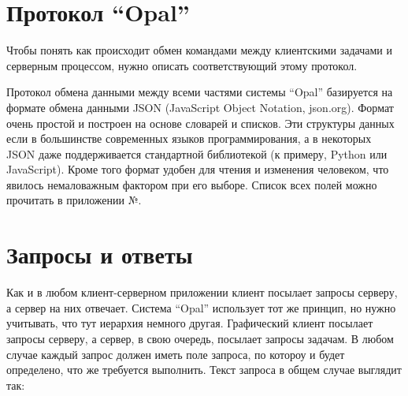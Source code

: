 \section{Протокол “Opal”}

Чтобы понять как происходит обмен командами между клиентскими задачами и серверным процессом, нужно описать соответствующий этому протокол.

Протокол обмена данными между всеми частями системы “Opal” базируется на формате обмена данными JSON (JavaScript Object Notation, json.org). Формат очень простой и построен на основе словарей и списков. Эти структуры данных если в большинстве современных языков программирования, а в некоторых JSON даже поддерживается стандартной библиотекой (к примеру, Python или JavaScript). Кроме того формат удобен для чтения и изменения человеком, что явилось немаловажным фактором при его выборе. Список всех полей можно прочитать в приложении №.

\section{Запросы и ответы}

Как и в любом клиент-серверном приложении клиент посылает запросы серверу, а сервер на них отвечает. Система “Opal” использует тот же принцип, но нужно учитывать, что тут иерархия немного другая. Графический клиент посылает запросы серверу, а сервер, в свою очередь, посылает запросы задачам. В любом случае каждый запрос должен иметь поле запроса, по котороу и будет определено, что же требуется выполнить. Текст запроса в общем случае выглядит так:

